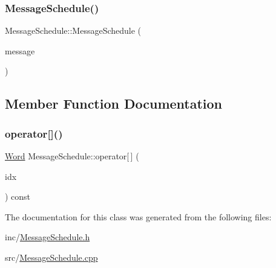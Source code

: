 \subsubsection{\texorpdfstring{Message\+Schedule()}{MessageSchedule()}}
{\footnotesize\ttfamily Message\+Schedule\+::\+Message\+Schedule (\begin{DoxyParamCaption}\item[{\mbox{\hyperlink{class_message_block}{Message\+Block}}}]{message }\end{DoxyParamCaption})}



\subsection{Member Function Documentation}
\mbox{\label{class_message_schedule_a06cb96598e3eccca151faa39ba414ff2}} 
\subsubsection{\texorpdfstring{operator[]()}{operator[]()}}
{\footnotesize\ttfamily \mbox{\hyperlink{class_word}{Word}} Message\+Schedule\+::operator\mbox{[}$\,$\mbox{]} (\begin{DoxyParamCaption}\item[{std\+::size\+\_\+t}]{idx }\end{DoxyParamCaption}) const}



The documentation for this class was generated from the following files\+:\begin{DoxyCompactItemize}
\item 
inc/\mbox{\hyperlink{_message_schedule_8h}{Message\+Schedule.\+h}}\item 
src/\mbox{\hyperlink{_message_schedule_8cpp}{Message\+Schedule.\+cpp}}\end{DoxyCompactItemize}
